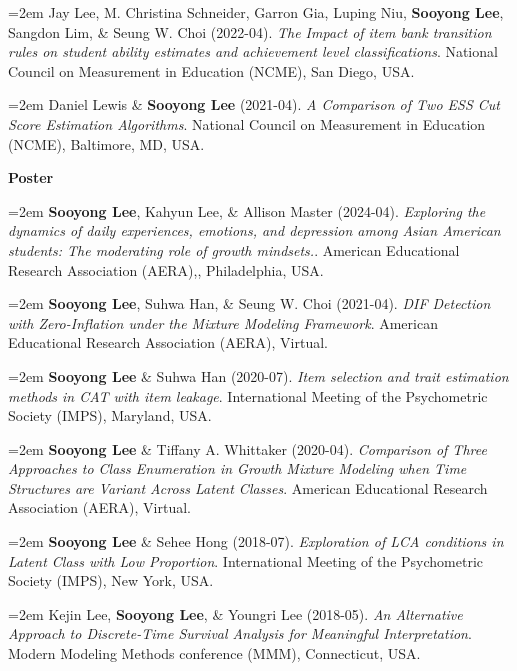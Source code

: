 \documentclass[11pt,letterpaper,]{awesome-me}
\begin{document}
\hangindent=2em  Jay Lee, M. Christina Schneider, Garron
Gia, Luping Niu, \textbf{Sooyong Lee}, Sangdon Lim, \& Seung W. Choi
(2022-04). \emph{The Impact of item bank transition rules on student
ability estimates and achievement level classifications}. National
Council on Measurement in Education (NCME), San Diego, USA.

\hangindent=2em  Daniel Lewis \& \textbf{Sooyong Lee}
(2021-04). \emph{A Comparison of Two ESS Cut Score Estimation
Algorithms}. National Council on Measurement in Education (NCME),
Baltimore, MD, USA.

\setlength{\leftskip}{0cm}

\textbf{Poster}

\setlength{\leftskip}{0.5cm}

\hangindent=2em  \textbf{Sooyong Lee}, Kahyun Lee, \&
Allison Master (2024-04). \emph{Exploring the dynamics of daily
experiences, emotions, and depression among Asian American students: The
moderating role of growth mindsets.}. American Educational Research
Association (AERA),, Philadelphia, USA.

\hangindent=2em  \textbf{Sooyong Lee}, Suhwa Han, \& Seung
W. Choi (2021-04). \emph{DIF Detection with Zero-Inflation under the
Mixture Modeling Framework}. American Educational Research Association
(AERA), Virtual.

\hangindent=2em  \textbf{Sooyong Lee} \& Suhwa Han
(2020-07). \emph{Item selection and trait estimation methods in CAT with
item leakage}. International Meeting of the Psychometric Society (IMPS),
Maryland, USA.

\hangindent=2em  \textbf{Sooyong Lee} \& Tiffany A.
Whittaker (2020-04). \emph{Comparison of Three Approaches to Class
Enumeration in Growth Mixture Modeling when Time Structures are Variant
Across Latent Classes}. American Educational Research Association
(AERA), Virtual.

\hangindent=2em  \textbf{Sooyong Lee} \& Sehee Hong
(2018-07). \emph{Exploration of LCA conditions in Latent Class with Low
Proportion}. International Meeting of the Psychometric Society (IMPS),
New York, USA.

\hangindent=2em  Kejin Lee, \textbf{Sooyong Lee}, \& Youngri
Lee (2018-05). \emph{An Alternative Approach to Discrete-Time Survival
Analysis for Meaningful Interpretation}. Modern Modeling Methods
conference (MMM), Connecticut, USA.

\setlength{\leftskip}{0cm}
\end{document}
